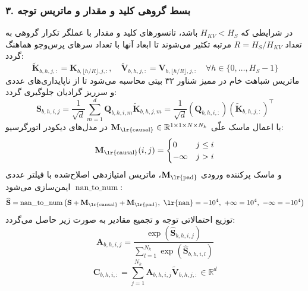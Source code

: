 \subsubsection*{۳. بسط گروهی کلید و مقدار و ماتریس توجه}
در شرایطی که $H_{KV} < H_S$ باشد، تانسورهای کلید و مقدار با عملگر تکرار گروهی  به تعداد $R = H_S / H_{KV}$ مرتبه تکثیر می‌شوند تا ابعاد آنها با تعداد سرهای پرس‌وجو هماهنگ گردد:
\begin{equation}
\tilde{\mathbf{K}}_{b, h, j, :} = \mathbf{K}_{b, \lfloor h/R \rfloor, j, :}, \quad \tilde{\mathbf{V}}_{b, h, j, :} = \mathbf{V}_{b, \lfloor h/R \rfloor, j, :} \quad \forall h \in \{0, \dots, H_S - 1\}
\end{equation}
ماتریس شباهت خام در ممیز شناور ۳۲ بیتی  محاسبه می‌شود تا از ناپایداری‌های عددی و سرریز گرادیان جلوگیری گردد:
\begin{equation}
\mathbf{S}_{b, h, i, j} = \frac{1}{\sqrt{d}} \sum_{m=1}^d \mathbf{Q}_{b, h, i, m} \tilde{\mathbf{K}}_{b, h, j, m} = \frac{1}{\sqrt{d}} \left( \mathbf{Q}_{b, h, i, :} \right) \left( \tilde{\mathbf{K}}_{b, h, j, :} \right)^\top
\end{equation}
با اعمال ماسک علّی $\mathbf{M}_{\text{\lr{causal}}} \in \mathbb{R}^{1 \times 1 \times N \times N_k}$ در مدل‌های دیکودر اتورگرسیو:
\begin{equation}
\mathbf{M}_{\text{\lr{causal}}}(i, j) = \begin{cases} 0 & j \le i \\ -\infty & j > i \end{cases}
\end{equation}
و ماسک پرکننده ورودی $\mathbf{M}_{\text{\lr{pad}}}$، ماتریس امتیازدهی اصلاح‌شده با فیلتر عددی $\operatorname{nan\_to\_num}$ ایمن‌سازی می‌شود:
\begin{equation}
\widehat{\mathbf{S}} = \operatorname{nan\_to\_num}\left( \mathbf{S} + \mathbf{M}_{\text{\lr{causal}}} + \mathbf{M}_{\text{\lr{pad}}}, \ \text{\lr{nan}}=-10^4, \ +\infty=10^4, \ -\infty=-10^4 \right)
\end{equation}
توزیع احتمالاتی توجه و تجمیع مقادیر به صورت زیر حاصل می‌گردد:
\begin{equation}
\mathbf{A}_{b, h, i, j} = \frac{\exp\left( \widehat{\mathbf{S}}_{b, h, i, j} \right)}{\sum_{l=1}^{N_k} \exp\left( \widehat{\mathbf{S}}_{b, h, i, l} \right)}
\end{equation}
\begin{equation}
\mathbf{C}_{b, h, i, :} = \sum_{j=1}^{N_k} \mathbf{A}_{b, h, i, j} \tilde{\mathbf{V}}_{b, h, j, :} \in \mathbb{R}^d
\end{equation}

